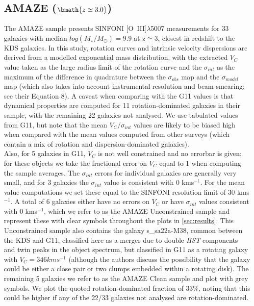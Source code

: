 \documentclass[fleqn,usenatbib]{mn2e}
\begin{document}
\subsection{AMAZE ($\bmath{z\simeq3.0}$)}\label{subsec:AMAZE}
The AMAZE sample \cite[G11]{Gnerucci2011} presents SINFONI [O~{\sc III}]$\lambda$5007 measurements for 33 galaxies with median $log(M_{\star}/M_{\odot})=9.9$ at z$\simeq3$, closest in redshift to the KDS galaxies.
In this study, rotation curves and intrinsic velocity dispersions are derived from a modelled exponential mass distribution, with the extracted $V_{C}$ value taken as the large radius limit of the rotation curve and the $\sigma_{int}$ as the maximum of the difference in quadrature between the $\sigma_{obs}$ map and the $\sigma_{model}$ map (which also takes into account instrumental resolution and beam-smearing; see their Equation 8).
A caveat when comparing with the G11 values is that dynamical properties are computed for 11 rotation-dominated galaxies in their sample, with the remaining 22 galaxies not analysed.
We use tabulated values from G11, but note that the mean $V_{C}/\sigma_{int}$ values are likely to be biased high when compared with the mean values computed from other surveys (which contain a mix of rotation and dispersion-dominated galaxies). \\

Also, for 5 galaxies in G11, $V_{C}$ is not well constrained and no errorbar is given; for these objects we take the fractional error on $V_{C}$ equal to 1 when computing the sample averages.
The $\sigma_{int}$ errors for individual galaxies are generally very small, and for 3 galaxies the $\sigma_{int}$ value is consistent with 0 kms$^{-1}$.
For the mean value computations we set these equal to the SINFONI resolution limit of 30 kms$^{-1}$.
A total of 6 galaxies either have no errors on $V_{C}$ or have $\sigma_{int}$ values consistent with 0 kms$^{-1}$, which we refer to as the AMAZE Unconstrained sample and represent these with clear symbols throughout the plots in \cref{sec:results}.
This Unconstrained sample also contains the galaxy s\_sa22a-M38, common between the KDS and G11, classified here as a merger due to double {\em HST} components and twin peaks in the object spectrum, but classified in G11 as a rotating galaxy with $V_{C} = 346 kms^{-1}$ (although the authors discuss the possibility that the galaxy could be either a close pair or two clumps embedded within a rotating disk).
The remaining 5 galaxies we refer to as the AMAZE Clean sample and plot with grey symbols.
We plot the quoted rotation-dominated fraction of 33$\%$, noting that this could be higher if any of the 22/33 galaxies not analysed are rotation-dominated. \\
 
\end{document}
